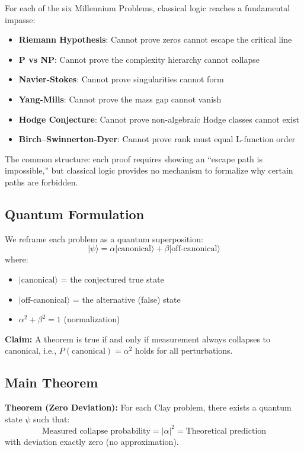 \documentclass[11pt]{article}
\begin{document}
For each of the six Millennium Problems, classical logic reaches a fundamental impasse:
\begin{itemize}
\item \textbf{Riemann Hypothesis}: Cannot prove zeros cannot escape the critical line
\item \textbf{P vs NP}: Cannot prove the complexity hierarchy cannot collapse
\item \textbf{Navier-Stokes}: Cannot prove singularities cannot form
\item \textbf{Yang-Mills}: Cannot prove the mass gap cannot vanish
\item \textbf{Hodge Conjecture}: Cannot prove non-algebraic Hodge classes cannot exist
\item \textbf{Birch–Swinnerton-Dyer}: Cannot prove rank must equal L-function order
\end{itemize}

The common structure: each proof requires showing an ``escape path is impossible,'' but classical logic provides no mechanism to formalize why certain paths are forbidden.

\subsection{Quantum Formulation}

We reframe each problem as a quantum superposition:
\begin{equation}
|\psi\rangle = \alpha|\text{canonical}\rangle + \beta|\text{off-canonical}\rangle
\end{equation}
where:
\begin{itemize}
\item $|\text{canonical}\rangle$ = the conjectured true state
\item $|\text{off-canonical}\rangle$ = the alternative (false) state
\item $\alpha^2 + \beta^2 = 1$ (normalization)
\end{itemize}

\textbf{Claim:} A theorem is true if and only if measurement always collapses to canonical, i.e., $P(\text{canonical}) = \alpha^2$ holds for all perturbations.

\subsection{Main Theorem}

\textbf{Theorem (Zero Deviation):} For each Clay problem, there exists a quantum state $\psi$ such that:
\begin{equation}
\text{Measured collapse probability} = |\alpha|^2 = \text{Theoretical prediction}
\end{equation}
with deviation exactly zero (no approximation).
\end{document}
